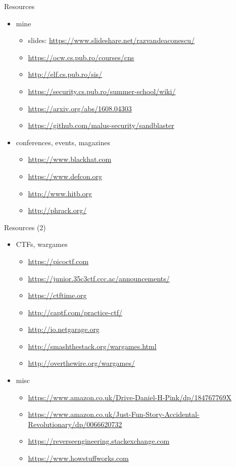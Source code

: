 \documentclass{simple}
\begin{document}
\begin{frame}{Resources}
  \begin{itemize}
    \item mine
      \begin{itemize}
        \item slides: \url{https://www.slideshare.net/razvandeaconescu/}
        \item \url{https://ocw.cs.pub.ro/courses/cns}
        \item \url{http://elf.cs.pub.ro/sis/}
        \item \url{https://security.cs.pub.ro/summer-school/wiki/}
        \item \url{https://arxiv.org/abs/1608.04303}
        \item \url{https://github.com/malus-security/sandblaster}
      \end{itemize}
    \item conferences, events, magazines
      \begin{itemize}
        \item \url{https://www.blackhat.com}
        \item \url{https://www.defcon.org}
        \item \url{http://www.hitb.org}
        \item \url{http://phrack.org/}
      \end{itemize}
  \end{itemize}
\end{frame}

\begin{frame}{Resources (2)}
  \begin{itemize}
    \item CTFs, wargames
      \begin{itemize}
        \item \url{https://picoctf.com}
        \item \url{https://junior.35c3ctf.ccc.ac/announcements/}
        \item \url{https://ctftime.org}
        \item \url{http://captf.com/practice-ctf/}
        \item \url{http://io.netgarage.org}
        \item \url{http://smashthestack.org/wargames.html}
        \item \url{http://overthewire.org/wargames/}
      \end{itemize}
    \item misc
      \begin{itemize}
        \item \url{https://www.amazon.co.uk/Drive-Daniel-H-Pink/dp/184767769X}
        \item \url{https://www.amazon.co.uk/Just-Fun-Story-Accidental-Revolutionary/dp/0066620732}
        \item \url{https://reverseengineering.stackexchange.com}
        \item \url{https://www.howstuffworks.com}
      \end{itemize}
  \end{itemize}
\end{frame}
\end{document}
